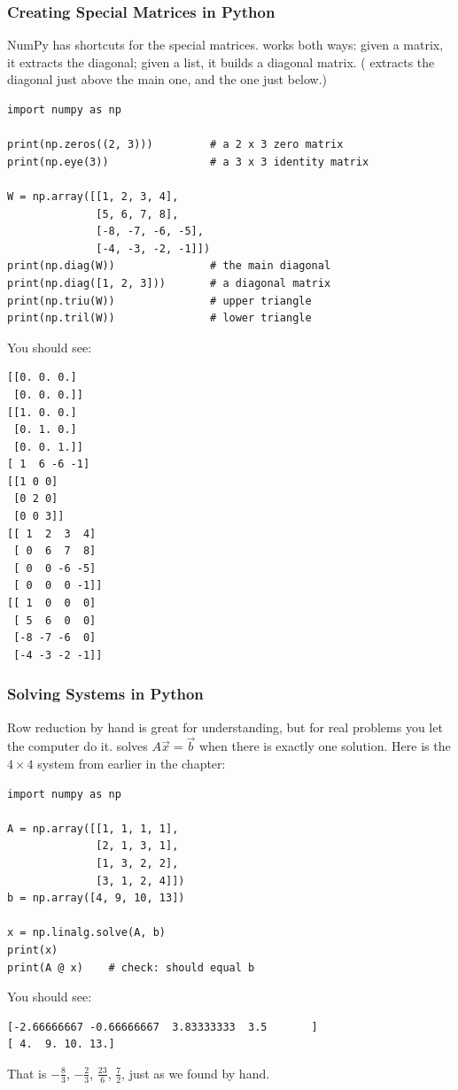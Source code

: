 \subsubsection{Creating Special Matrices in Python}
NumPy has shortcuts for the special matrices.  works
both ways: given a matrix, it extracts the diagonal; given a list, it
builds a diagonal matrix. ( extracts the diagonal
just above the main one, and  the one just
below.)
\begin{verbatim}
import numpy as np

print(np.zeros((2, 3)))         # a 2 x 3 zero matrix
print(np.eye(3))                # a 3 x 3 identity matrix

W = np.array([[1, 2, 3, 4],
              [5, 6, 7, 8],
              [-8, -7, -6, -5],
              [-4, -3, -2, -1]])
print(np.diag(W))               # the main diagonal
print(np.diag([1, 2, 3]))       # a diagonal matrix
print(np.triu(W))               # upper triangle
print(np.tril(W))               # lower triangle
\end{verbatim}
You should see:
\begin{verbatim}
[[0. 0. 0.]
 [0. 0. 0.]]
[[1. 0. 0.]
 [0. 1. 0.]
 [0. 0. 1.]]
[ 1  6 -6 -1]
[[1 0 0]
 [0 2 0]
 [0 0 3]]
[[ 1  2  3  4]
 [ 0  6  7  8]
 [ 0  0 -6 -5]
 [ 0  0  0 -1]]
[[ 1  0  0  0]
 [ 5  6  0  0]
 [-8 -7 -6  0]
 [-4 -3 -2 -1]]
\end{verbatim}

\subsubsection{Solving Systems in Python}
Row reduction by hand is great for understanding, but for real problems
you let the computer do it.  solves
$A\vec{x} = \vec{b}$ when there is exactly one solution. Here is the $4
\times 4$ system from earlier in the chapter:
\begin{verbatim}
import numpy as np

A = np.array([[1, 1, 1, 1],
              [2, 1, 3, 1],
              [1, 3, 2, 2],
              [3, 1, 2, 4]])
b = np.array([4, 9, 10, 13])

x = np.linalg.solve(A, b)
print(x)
print(A @ x)    # check: should equal b
\end{verbatim}
You should see:
\begin{verbatim}
[-2.66666667 -0.66666667  3.83333333  3.5       ]
[ 4.  9. 10. 13.]
\end{verbatim}
That is $-\frac{8}{3}$, $-\frac{2}{3}$, $\frac{23}{6}$, $\frac{7}{2}$, just
as we found by hand.

